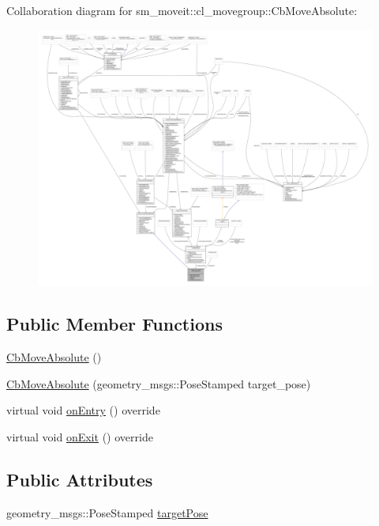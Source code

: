 Collaboration diagram for sm\+\_\+moveit\+:\+:cl\+\_\+movegroup\+:\+:Cb\+Move\+Absolute\+:
\nopagebreak
\begin{figure}[H]
\begin{center}
\leavevmode
\includegraphics[width=350pt]{classsm__moveit_1_1cl__movegroup_1_1CbMoveAbsolute__coll__graph}
\end{center}
\end{figure}
\subsection*{Public Member Functions}
\begin{DoxyCompactItemize}
\item 
\hyperlink{classsm__moveit_1_1cl__movegroup_1_1CbMoveAbsolute_ac5f4f62028add1d559debec021dbdae6}{Cb\+Move\+Absolute} ()
\item 
\hyperlink{classsm__moveit_1_1cl__movegroup_1_1CbMoveAbsolute_a88a650615f4f24502e8089026c6298d0}{Cb\+Move\+Absolute} (geometry\+\_\+msgs\+::\+Pose\+Stamped target\+\_\+pose)
\item 
virtual void \hyperlink{classsm__moveit_1_1cl__movegroup_1_1CbMoveAbsolute_a25270a36013f6bda969f6f8e832053cf}{on\+Entry} () override
\item 
virtual void \hyperlink{classsm__moveit_1_1cl__movegroup_1_1CbMoveAbsolute_aa96ee28b46a3fc9e2d70eae302ffb5c7}{on\+Exit} () override
\end{DoxyCompactItemize}
\subsection*{Public Attributes}
\begin{DoxyCompactItemize}
\item 
geometry\+\_\+msgs\+::\+Pose\+Stamped \hyperlink{classsm__moveit_1_1cl__movegroup_1_1CbMoveAbsolute_aba451c75e2dfda0bc38fd043a8b24ab5}{target\+Pose}
\end{DoxyCompactItemize}
